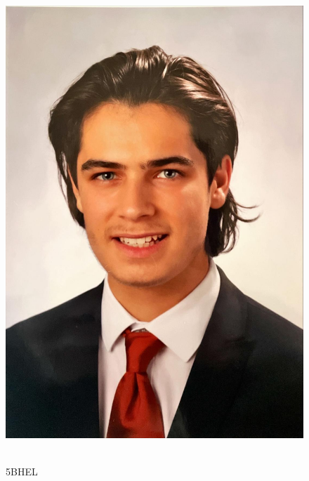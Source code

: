 \begin{figure}[h]
  \centering
  \begin{adjustbox}{valign=c}
    \includegraphics[scale=0.105]{image/consti.jpg}
  \end{adjustbox}
  \hfill
  \begin{minipage}[b]{0.7\textwidth}
    \textbf{\nameCZ} \\ 5BHEL
  \end{minipage}
  \captionsetup{justification=raggedright,singlelinecheck=false}
  \caption{\nameCZ}
\end{figure}

